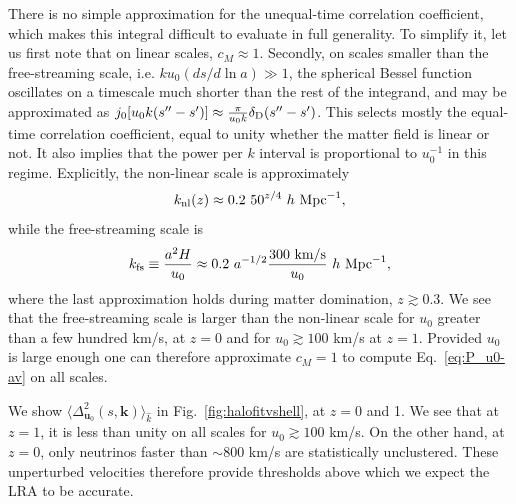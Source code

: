 \documentclass[useAMS, usenatbib]{mnras}
\newcommand{\beq}{\begin{equation}}
\newcommand{\eeq}{\end{equation}}
\newcommand{\barr}{\begin{eqnarray}}
\newcommand{\earr}{\end{eqnarray}}
\newcommand{\bs}{\boldsymbol}
\begin{document}
There is no simple approximation for the unequal-time correlation coefficient, which makes this integral difficult to evaluate in full generality. To simplify it, let us first note that on linear scales, $c_M \approx 1$. Secondly, on scales smaller than the free-streaming scale, i.e. $k u_0 (ds/d\ln a) \gg 1$, the spherical Bessel function oscillates on a timescale much shorter than the rest of the integrand, and may be approximated as $j_0[u_0 k (s'' - s')] \approx \frac{\pi}{u_0 k} \delta_{\rm D}(s'' - s')$. This selects mostly the equal-time correlation coefficient, equal to unity whether the matter field is linear or not. It also implies that the power per $k$ interval is proportional to $u_0^{-1}$ in this regime.
Explicitly, the non-linear scale is approximately
 \beq
 k_{\rm nl}(z) \approx 0.2~50^{z/4}~ h ~ \textrm{Mpc}^{-1},
 \eeq
while the free-streaming scale is
\beq
k_{\rm fs} \equiv \frac{a^2 H}{u_0} \approx 0.2 ~a^ {-1/2}\frac{300~ \textrm{km/s}}{u_0} ~ h ~ \textrm{Mpc}^{-1},
\eeq
where the last approximation holds during matter domination, $z \gtrsim 0.3$. We see that the free-streaming scale is larger than the non-linear scale for $u_0$ greater than a few hundred km/s, at $z = 0$ and for $u_0 \gtrsim 100$ km/s at $z = 1$. Provided $u_0$ is large enough one can therefore approximate $c_M = 1$ to compute Eq.~\eqref{eq:P_u0-av} on all scales.

We show $\langle \Delta^2_{\bs{u}_0}(s, \bs{k})\rangle_{\hat{k}}$ in Fig.~\ref{fig:halofitvshell}, at $z = 0$ and 1. We see that at $z = 1$, it is less than unity on all scales for $u_0 \gtrsim 100$ km/s. On the other hand, at $z= 0$, only neutrinos faster than $\sim 800$ km/s are statistically unclustered. These unperturbed velocities therefore provide thresholds above which we expect the LRA to be accurate.
\end{document}
